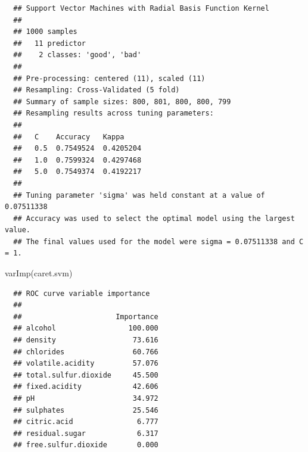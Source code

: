 \documentclass[
]{book}
\newenvironment{Shaded}{\begin{snugshade}}{\end{snugshade}}
\newcommand{\AttributeTok}[1]{\textcolor[rgb]{0.77,0.63,0.00}{#1}}
\newcommand{\FunctionTok}[1]{\textcolor[rgb]{0.00,0.00,0.00}{#1}}
\newcommand{\NormalTok}[1]{#1}
\newcommand{\SpecialCharTok}[1]{\textcolor[rgb]{0.00,0.00,0.00}{#1}}
\theoremstyle{break}
\theoremstyle{nonumberplain}
\begin{document}
\begin{verbatim}
  ## Support Vector Machines with Radial Basis Function Kernel 
  ## 
  ## 1000 samples
  ##   11 predictor
  ##    2 classes: 'good', 'bad' 
  ## 
  ## Pre-processing: centered (11), scaled (11) 
  ## Resampling: Cross-Validated (5 fold) 
  ## Summary of sample sizes: 800, 801, 800, 800, 799 
  ## Resampling results across tuning parameters:
  ## 
  ##   C    Accuracy   Kappa    
  ##   0.5  0.7549524  0.4205204
  ##   1.0  0.7599324  0.4297468
  ##   5.0  0.7549374  0.4192217
  ## 
  ## Tuning parameter 'sigma' was held constant at a value of 0.07511338
  ## Accuracy was used to select the optimal model using the largest value.
  ## The final values used for the model were sigma = 0.07511338 and C = 1.
\end{verbatim}

\begin{Shaded}
\begin{Highlighting}[]
\FunctionTok{varImp}\NormalTok{(caret.svm)}
\end{Highlighting}
\end{Shaded}

\begin{verbatim}
  ## ROC curve variable importance
  ## 
  ##                      Importance
  ## alcohol                 100.000
  ## density                  73.616
  ## chlorides                60.766
  ## volatile.acidity         57.076
  ## total.sulfur.dioxide     45.500
  ## fixed.acidity            42.606
  ## pH                       34.972
  ## sulphates                25.546
  ## citric.acid               6.777
  ## residual.sugar            6.317
  ## free.sulfur.dioxide       0.000
\end{verbatim}

\begin{Shaded}
\end{Shaded}
\end{document}
